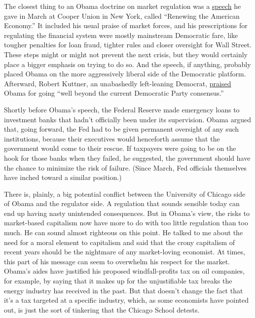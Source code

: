 The closest thing to an Obama doctrine on market regulation was a
\href{http://www.nytimes3xbfgragh.onion/2008/03/27/us/politics/27text-obama.html?pagewanted=print}{speech}
he gave in March at Cooper Union in New York, called ``Renewing the
American Economy.'' It included his usual praise of market forces, and
his prescriptions for regulating the financial system were mostly
mainstream Democratic fare, like tougher penalties for loan fraud,
tighter rules and closer oversight for Wall Street. These steps might or
might not prevent the next crisis, but they would certainly place a
bigger emphasis on trying to do so. And the speech, if anything,
probably placed Obama on the more aggressively liberal side of the
Democratic platform. Afterward, Robert Kuttner, an unabashedly
left-leaning Democrat,
\href{http://www.prospect.org/cs/articles?article=obama_v_krugman}{praised}
Obama for going ``well beyond the current Democratic Party consensus.''

Shortly before Obama's speech, the Federal Reserve made emergency loans
to investment banks that hadn't officially been under its supervision.
Obama argued that, going forward, the Fed had to be given permanent
oversight of any such institutions, because their executives would
henceforth assume that the government would come to their rescue. If
taxpayers were going to be on the hook for those banks when they failed,
he suggested, the government should have the chance to minimize the risk
of failure. (Since March, Fed officials themselves have inched toward a
similar position.)

There is, plainly, a big potential conflict between the University of
Chicago side of Obama and the regulator side. A regulation that sounds
sensible today can end up having nasty unintended consequences. But in
Obama's view, the risks to market-based capitalism now have more to do
with too little regulation than too much. He can sound almost righteous
on this point. He talked to me about the need for a moral element to
capitalism and said that the crony capitalism of recent years should be
the nightmare of any market-loving economist. At times, this part of his
message can seem to overwhelm his respect for the market. Obama's aides
have justified his proposed windfall-profits tax on oil companies, for
example, by saying that it makes up for the unjustifiable tax breaks the
energy industry has received in the past. But that doesn't change the
fact that it's a tax targeted at a specific industry, which, as some
economists have pointed out, is just the sort of tinkering that the
Chicago School detests.

